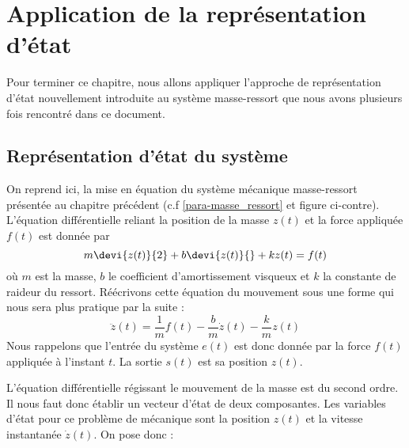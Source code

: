 \section{Application de la représentation d'état}
Pour terminer ce chapitre, nous allons appliquer l'approche de représentation
d'état nouvellement introduite au système masse-ressort que nous avons 
plusieurs fois rencontré dans ce document. 
\subsection{Représentation d'état du système}
On reprend ici, la mise en équation du système mécanique masse-ressort 
présentée au chapitre précédent (c.f \cref{para-masse_ressort} et figure 
ci-contre). L'équation différentielle reliant la position de la masse $z(t)$ et 
la force appliquée $f(t)$ est donnée par 
\[
m\devi{z(t)}{2}+b\devi{z(t)}{}+kz(t)=f(t)
\]
où $m$ est la masse, $b$ le coefficient d'amortissement visqueux et $k$ la
constante de raideur du ressort. 
Réécrivons cette équation du mouvement sous une forme qui nous sera plus
pratique par la suite :
\[
    \ddot{z}(t)=\dfrac{1}{m}f(t)-\dfrac{b}{m}\dot{z}(t)-\dfrac{k}{m}z(t)
\]
Nous rappelons que l'entrée du système $e(t)$ est donc donnée par la force 
$f(t)$ appliquée à l'instant $t$. La sortie $s(t)$ est sa position $z(t)$.
\begin{marginfigure}
    \centering
    
\end{marginfigure}
L'équation différentielle régissant le mouvement de la masse est du second 
ordre. Il nous faut donc établir un vecteur d'état de deux composantes.
Les variables d'état pour ce problème de mécanique sont la 
position $z(t)$ et la vitesse instantanée $\dot{z}(t)$.
On pose donc :

